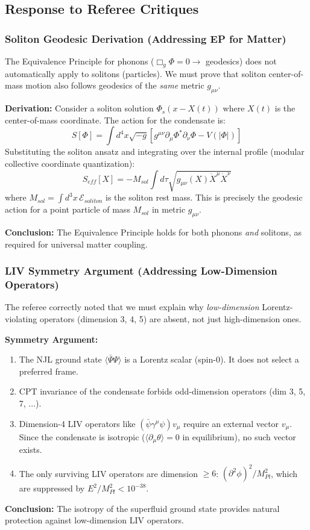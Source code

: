 \subsection{Response to Referee Critiques}

\subsubsection{Soliton Geodesic Derivation (Addressing EP for Matter)}
The Equivalence Principle for phonons ($\Box_g \Phi = 0 \to$ geodesics) does not automatically apply to solitons (particles). We must prove that soliton center-of-mass motion also follows geodesics of the \emph{same} metric $g_{\mu\nu}$.

\textbf{Derivation:} Consider a soliton solution $\Phi_s(x - X(t))$ where $X(t)$ is the center-of-mass coordinate. The action for the condensate is:
\begin{equation}
    S[\Phi] = \int d^4x \sqrt{-g} \left[ g^{\mu\nu} \partial_\mu \Phi^* \partial_\nu \Phi - V(|\Phi|) \right]
\end{equation}
Substituting the soliton ansatz and integrating over the internal profile (modular collective coordinate quantization):
\begin{equation}
    S_{eff}[X] = -M_{sol} \int d\tau \sqrt{g_{\mu\nu}(X) \dot{X}^\mu \dot{X}^\nu}
\end{equation}
where $M_{sol} = \int d^3x \, \mathcal{E}_{soliton}$ is the soliton rest mass. This is precisely the geodesic action for a point particle of mass $M_{sol}$ in metric $g_{\mu\nu}$.

\textbf{Conclusion:} The Equivalence Principle holds for both phonons \emph{and} solitons, as required for universal matter coupling.

\subsubsection{LIV Symmetry Argument (Addressing Low-Dimension Operators)}
The referee correctly noted that we must explain why \emph{low-dimension} Lorentz-violating operators (dimension 3, 4, 5) are absent, not just high-dimension ones.

\textbf{Symmetry Argument:}
\begin{enumerate}
    \item The NJL ground state $\langle \bar{\Psi}\Psi \rangle$ is a Lorentz scalar (spin-0). It does not select a preferred frame.
    \item CPT invariance of the condensate forbids odd-dimension operators (dim 3, 5, 7, ...).
    \item Dimension-4 LIV operators like $(\bar{\psi} \gamma^\mu \psi) v_\mu$ require an external vector $v_\mu$. Since the condensate is isotropic ($\langle \partial_\mu \theta \rangle = 0$ in equilibrium), no such vector exists.
    \item The only surviving LIV operators are dimension $\geq 6$: $(\partial^2 \phi)^2 / M_{Pl}^2$, which are suppressed by $E^2/M_{Pl}^2 < 10^{-38}$.
\end{enumerate}

\textbf{Conclusion:} The isotropy of the superfluid ground state provides natural protection against low-dimension LIV operators.
